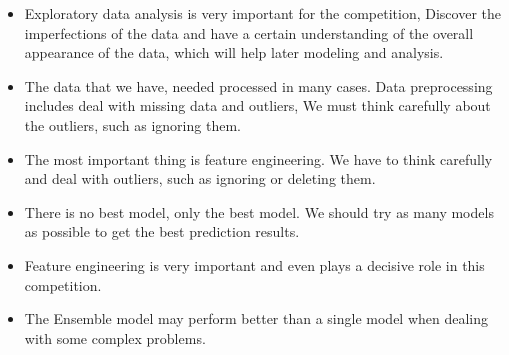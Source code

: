 \begin{itemize}
	\item Exploratory data analysis is 
	very important for the competition,
	Discover the imperfections of the 
	data and have a certain understanding 
	of the overall appearance of the data, 
	which will help later modeling and analysis. 
	\item The data that we have,
	needed processed in many cases.
	Data preprocessing includes 
	deal with missing data and outliers, 
	We must think carefully about the outliers, 
	such as ignoring them.
	\item The most important thing is
	feature engineering.
	We have to think carefully and 
	deal with outliers, such as ignoring 
	or deleting them.
	\item There is no best model, 
	only the best model. We should 
	try as many models as possible to 
	get the best prediction results. 
	\item Feature engineering is very 
	important and even plays a decisive 
	role in this competition.
	\item The Ensemble model may perform better 
	than a single model when dealing 
	with some complex problems.	
\end{itemize}











